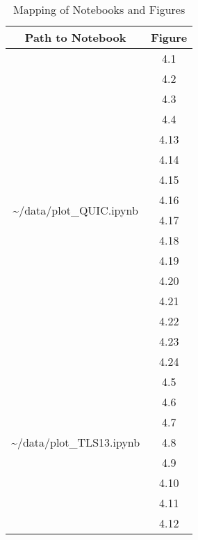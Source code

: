 \begin{table}[!htb]
\centering
\caption{Mapping of Notebooks and Figures}
\begin{tabular}{| c | c |}
\hline
Path to Notebook & Figure\\
\hline	
\multirow{16}{*}{\textasciitilde /data/plot\_QUIC.ipynb} & 4.1\\
& 4.2 \\
& 4.3 \\
& 4.4 \\
& 4.13 \\
& 4.14 \\
& 4.15 \\
& 4.16 \\
& 4.17 \\
& 4.18 \\
& 4.19 \\
& 4.20 \\
& 4.21 \\
& 4.22 \\
& 4.23 \\
& 4.24 \\
\hline
\multirow{7}{*}{\textasciitilde /data/plot\_TLS13.ipynb} & 4.5 \\
& 4.6 \\
& 4.7 \\
& 4.8 \\
& 4.9 \\
& 4.10 \\
& 4.11 \\
& 4.12 \\
\hline	
\end{tabular}
\label{tab:figures}
\end{table}